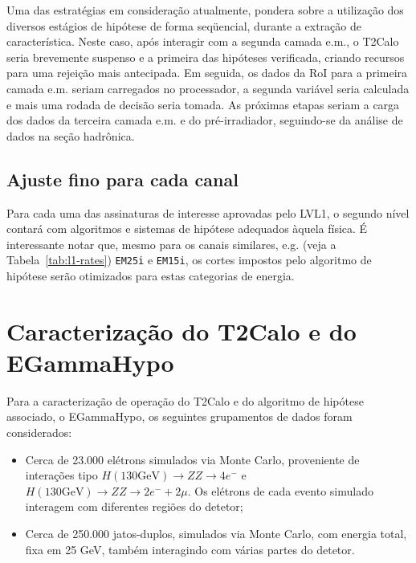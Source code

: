 Uma das estratégias em consideração atualmente, pondera sobre a utilização dos
diversos estágios de hipótese de forma seqüencial, durante a extração de
característica. Neste caso, após interagir com a segunda camada e.m., o T2Calo
seria brevemente suspenso e a primeira das hipóteses verificada, criando
recursos para uma rejeição mais antecipada. Em seguida, os dados da RoI para a
primeira camada e.m. seriam carregados no processador, a segunda variável
seria calculada e mais uma rodada de decisão seria tomada. As próximas etapas
seriam a carga dos dados da terceira camada e.m. e do pré-irradiador,
seguindo-se da análise de dados na seção hadrônica.

\subsection{Ajuste fino para cada canal}

Para cada uma das assinaturas de interesse aprovadas pelo LVL1, o segundo
nível contará com algoritmos e sistemas de hipótese adequados àquela física. É
interessante notar que, mesmo para os canais similares, e.g. (veja a
Tabela~\ref{tab:l1-rates}) \texttt{EM25i} e \texttt{EM15i}, os cortes impostos
pelo algoritmo de hipótese serão otimizados para estas categorias de energia.


\section{Caracterização do T2Calo e do EGammaHypo}
\label{sec:def-eghypo}

Para a caracterização de operação do T2Calo e do algoritmo de hipótese
associado, o EGammaHypo, os seguintes grupamentos de dados foram
considerados:

\begin{itemize}
\item Cerca de 23.000 elétrons simulados via Monte Carlo, proveniente de
interações tipo $H (130 \text{GeV})\rightarrow ZZ \rightarrow 4e^-$ e 
$H (130 \text{GeV})\rightarrow ZZ \rightarrow 2e^- + 2\mu$. Os elétrons de
cada evento simulado interagem com diferentes regiões do detetor;
\item Cerca de 250.000 jatos-duplos, simulados via Monte Carlo, com energia total,
fixa em 25 GeV, também interagindo com várias partes do detetor.
\end{itemize}

